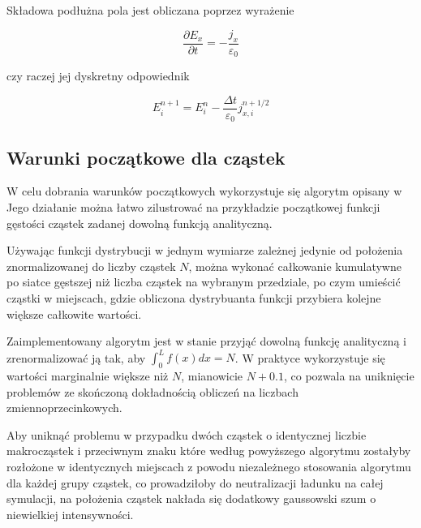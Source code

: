     Składowa podłużna pola jest obliczana poprzez wyrażenie

    \begin{equation}
    \frac{\partial E_x}{\partial t} = - \frac{j_x}{\varepsilon_0}
    \label{longitudinal-field-differential}
    \end{equation}

    czy raczej jej dyskretny odpowiednik

    \begin{equation}
        E_i^{n+1} = E_i^n - \frac{\Delta t}{\varepsilon_0} j_{x,i}^{n+1/2}
    \label{longitudinal-field-finite-differential}
    \end{equation}


    \subsection{Warunki początkowe dla cząstek}

    W celu dobrania warunków początkowych wykorzystuje się algorytm opisany w
     Jego działanie można łatwo zilustrować na
    przykładzie początkowej funkcji gęstości cząstek zadanej dowolną funkcją
    analityczną. 

    Używając funkcji dystrybucji w jednym wymiarze zależnej jedynie od
    położenia znormalizowanej do liczby cząstek $N$, można wykonać całkowanie
    kumulatywne po siatce gęstszej niż liczba cząstek na wybranym przedziale,
    po czym umieścić cząstki w miejscach, gdzie obliczona dystrybuanta funkcji
    przybiera kolejne większe całkowite wartości.


    Zaimplementowany algorytm jest w stanie przyjąć dowolną funkcję analityczną
     i zrenormalizować ją tak, aby $\int_0^L
    f(x) dx = N$. W praktyce wykorzystuje się wartości marginalnie większe niż
    $N$, mianowicie $N+0.1$, co pozwala na uniknięcie problemów ze skończoną
    dokładnością obliczeń na liczbach zmiennoprzecinkowych.

    Aby uniknąć problemu w przypadku dwóch  cząstek o identycznej
    liczbie makrocząstek i przeciwnym znaku które według powyższego algorytmu
    zostałyby rozłożone w identycznych miejscach z powodu niezależnego
    stosowania algorytmu dla każdej grupy cząstek, co prowadziłoby do
    neutralizacji ładunku na całej symulacji, na położenia cząstek nakłada się
    dodatkowy gaussowski szum o niewielkiej intensywności.

